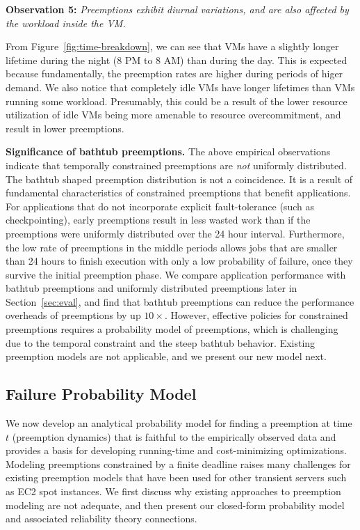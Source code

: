 \documentclass[sigconf]{acmart} %
\newcommand{\subsecspace}[0]{-0.20cm}
\begin{document}
\noindent \textbf{Observation 5:} \emph{Preemptions exhibit diurnal variations, and are also affected by the workload inside the VM.}

From Figure~\ref{fig:time-breakdown}, we can see that VMs have a slightly longer lifetime during the night (8 PM to 8 AM) than during the day\footnotemark. 
This is expected because fundamentally, the preemption rates are higher during periods of higer demand. 
We also notice that completely idle VMs have longer lifetimes than VMs running some workload.
Presumably, this could be a result of the lower resource utilization of idle VMs being more amenable to resource overcommitment, and result in lower preemptions. 


\noindent \textbf{Significance of bathtub preemptions.} 
The above empirical observations indicate that temporally constrained preemptions are \emph{not} uniformly distributed. 
The bathtub shaped preemption distribution is not a coincidence.
It is a result of fundamental characteristics of constrained preemptions that benefit applications. 
For applications that do not incorporate explicit fault-tolerance (such as checkpointing), early preemptions result in less wasted work than if the preemptions were uniformly distributed over the 24 hour interval.
Furthermore, the low rate of preemptions in the middle periods allows jobs that are smaller than 24 hours to finish execution with only a low probability of failure, once they survive the initial preemption phase. 
We compare application performance with bathtub preemptions and uniformly distributed preemptions later in Section~\ref{sec:eval}, and find that bathtub preemptions can reduce the performance overheads of preemptions by up $10\times$.
However, effective policies for constrained preemptions  requires a probability model of preemptions, which is challenging due to the temporal constraint and the steep bathtub behavior. 
Existing preemption models are not applicable, and we present our new model next. 

\vspace*{\subsecspace}
\subsection{Failure Probability Model}
\label{subsec:analytical-model}

We now develop an analytical probability model for finding a preemption at time $t$ (preemption dynamics) that is faithful to the empirically observed data and provides a basis for developing running-time and cost-minimizing optimizations. %
Modeling preemptions constrained by a finite deadline raises many challenges for existing preemption models that have been used for other transient servers such as EC2 spot instances.
We first discuss why existing approaches to preemption modeling are not adequate, and then present our closed-form probability model and associated reliability theory connections. 
\end{document}
